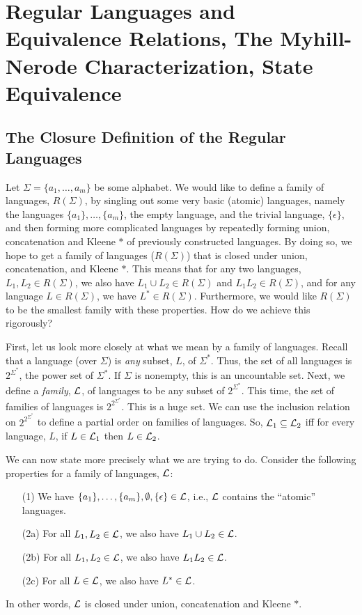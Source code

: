 \chapter[Regular Languages, Minimization of DFA's]
{Regular Languages and Equivalence Relations,
The Myhill-Nerode Characterization, State Equivalence}
\label{chapmn}
\section{The Closure Definition of the Regular Languages}
\label{sec1}
Let $\Sigma = \{a_1, \ldots, a_m\}$ be some alphabet.
We would like to define a family of languages,
$R(\Sigma)$, by singling out some very basic (atomic)
languages, namely the languages
$\{a_1\}, \ldots, \{a_m\}$, the empty language, and the
trivial language, $\{\epsilon\}$, and then
forming more complicated languages by repeatedly forming
union, concatenation and Kleene $*$ of previously
constructed languages. By doing so, we hope to get
a family of languages ($R(\Sigma)$) that is closed under union,
concatenation, and Kleene $*$. This means that
for any two languages, $L_1, L_2\in R(\Sigma)$,
we also have $L_1\cup L_2\in R(\Sigma)$ and
$L_1 L_2\in R(\Sigma)$, and for
any language $L\in R(\Sigma)$, we have $L^*\in R(\Sigma)$.
Furthermore, we would like $R(\Sigma)$ to be the smallest
family with these properties. How do we achieve this
rigorously?

\medskip
First, let us look more closely at what we mean by a family
of languages. Recall that a language (over $\Sigma$) is
{\it any\/} subset, $L$, of $\Sigma^*$. Thus, the set
of all languages is $2^{\Sigma^*}$, the power set of $\Sigma^*$.
If $\Sigma$ is nonempty, this is an uncountable set.
Next, we define a {\it family\/}, ${\cal L}$, of languages to be any
subset of $2^{\Sigma^*}$. This time, the set of families
of languages is $2^{2^{\Sigma^*}}$. This is a huge set.
We can use the inclusion relation on 
$2^{2^{\Sigma^*}}$ to define a partial order on families
of languages. So, ${\cal L}_1\subseteq {\cal L}_2$ iff
for every language, $L$, if $L\in {\cal L}_1$ then
$L\in {\cal L}_2$.

\medskip
We can now state more precisely what we are trying to do.
Consider the following properties for a family
of languages, ${\cal L}$:
\begin{enumerate}
\item[(1)]
We have $\{a_1\}, \ldots, \{a_m\}, \emptyset, \{\epsilon\}\in {\cal L}$,
i.e., ${\cal L}$ contains the ``atomic'' languages.
\item[(2a)]
For all $L_1, L_2\in {\cal L}$, we also have $L_1\cup L_2\in {\cal L}$.
\item[(2b)]
For all $L_1, L_2\in {\cal L}$, we also have $L_1 L_2\in {\cal L}$.
\item[(2c)]
For all $L\in {\cal L}$, we also have $L^*\in {\cal L}$.
\end{enumerate}
In other words, ${\cal L}$ is closed under union, concatenation
and Kleene $*$.


